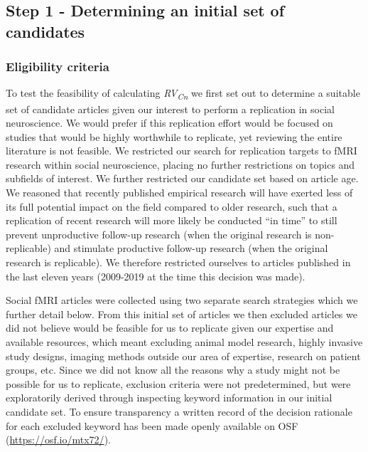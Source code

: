 \documentclass[
  man,floatsintext]{apa6}
\begin{document}
\hypertarget{step-1---determining-an-initial-set-of-candidates}{%
\subsection{Step 1 - Determining an initial set of candidates}\label{step-1---determining-an-initial-set-of-candidates}}

\hypertarget{eligibility-criteria}{%
\subsubsection{Eligibility criteria}\label{eligibility-criteria}}

To test the feasibility of calculating \emph{RV\textsubscript{Cn}} we first set out to determine a suitable set of candidate articles given our interest to perform a replication in social neuroscience. We would prefer if this replication effort would be focused on studies that would be highly worthwhile to replicate, yet reviewing the entire literature is not feasible. We restricted our search for replication targets to fMRI research within social neuroscience, placing no further restrictions on topics and subfields of interest. We further restricted our candidate set based on article age. We reasoned that recently published empirical research will have exerted less of its full potential impact on the field compared to older research, such that a replication of recent research will more likely be conducted ``in time'' to still prevent unproductive follow-up research (when the original research is non-replicable) and stimulate productive follow-up research (when the original research is replicable). We therefore restricted ourselves to articles published in the last eleven years (2009-2019 at the time this decision was made).

Social fMRI articles were collected using two separate search strategies which we further detail below. From this initial set of articles we then excluded articles we did not believe would be feasible for us to replicate given our expertise and available resources, which meant excluding animal model research, highly invasive study designs, imaging methods outside our area of expertise, research on patient groups, etc. Since we did not know all the reasons why a study might not be possible for us to replicate, exclusion criteria were not predetermined, but were exploratorily derived through inspecting keyword information in our initial candidate set. To ensure transparency a written record of the decision rationale for each excluded keyword has been made openly available on OSF (\url{https://osf.io/mtx72/}).\\
\end{document}
